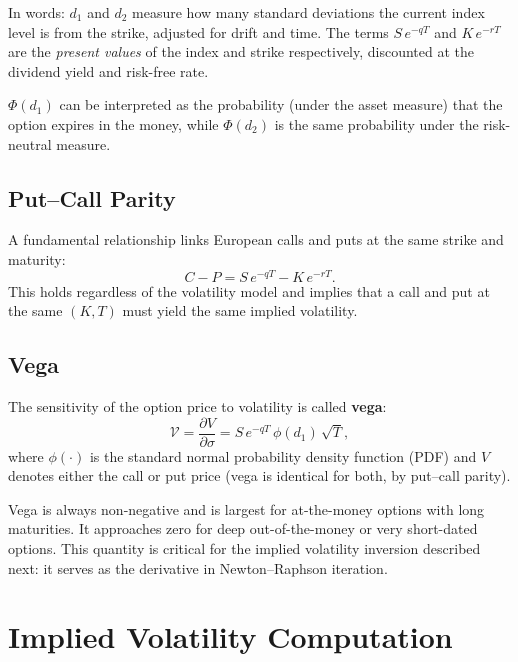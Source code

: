 \documentclass[12pt, a4paper]{article}
\begin{document}
In words: $d_1$ and $d_2$ measure how many standard deviations the current
index level is from the strike, adjusted for drift and time. The terms
$S\,e^{-qT}$ and $K\,e^{-rT}$ are the \emph{present values} of the index and
strike respectively, discounted at the dividend yield and risk-free rate.

$\Phi(d_1)$ can be interpreted as the probability (under the asset measure)
that the option expires in the money, while $\Phi(d_2)$ is the same probability
under the risk-neutral measure.

\subsection{Put--Call Parity}

A fundamental relationship links European calls and puts at the same strike and
maturity:
\begin{equation}
    C - P = S\,e^{-qT} - K\,e^{-rT}.
    \label{eq:pcp}
\end{equation}
This holds regardless of the volatility model and implies that a call and put at
the same $(K, T)$ must yield the same implied volatility.

\subsection{Vega}

The sensitivity of the option price to volatility is called \textbf{vega}:
\begin{equation}
    \mathcal{V} = \frac{\partial V}{\partial \sigma}
                = S\,e^{-qT}\,\phi(d_1)\,\sqrt{T},
    \label{eq:vega}
\end{equation}
where $\phi(\cdot)$ is the standard normal probability density function (PDF)
and $V$ denotes either the call or put price (vega is identical for both, by
put--call parity).

Vega is always non-negative and is largest for at-the-money options with long
maturities. It approaches zero for deep out-of-the-money or very short-dated
options. This quantity is critical for the implied volatility inversion described
next: it serves as the derivative in Newton--Raphson iteration.

\section{Implied Volatility Computation}
\label{sec:iv}
\end{document}

